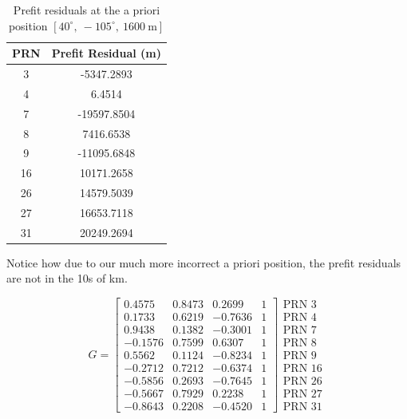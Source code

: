 \documentclass[11pt]{article}
\begin{document}
\begin{table}[h!]
    \centering
    \begin{tabular}{|c|c|}
        \hline
        \textbf{PRN} & \textbf{Prefit Residual (m)} \\ \hline
        3  & -5347.2893 \\ \hline
        4  & 6.4514 \\ \hline
        7  & -19597.8504 \\ \hline
        8  & 7416.6538 \\ \hline
        9  & -11095.6848 \\ \hline
        16 & 10171.2658 \\ \hline
        26 & 14579.5039 \\ \hline
        27 & 16653.7118 \\ \hline
        31 & 20249.2694 \\ \hline
    \end{tabular}
    \caption{Prefit residuals at the a priori position $[40^\circ,\ -105^\circ,\ 1600~\mathrm{m}]$}
    \label{tab:prefit_p3}
\end{table}

\hspace*{2em}Notice how due to our much more incorrect a priori position, the prefit residuals are not in the 10s of km. 

\[
G = \begin{bmatrix}
 0.4575 & 0.8473 &  0.2699 & 1 \\
 0.1733 & 0.6219 & -0.7636 & 1 \\
 0.9438 & 0.1382 & -0.3001 & 1 \\
-0.1576 & 0.7599 &  0.6307 & 1 \\
 0.5562 & 0.1124 & -0.8234 & 1 \\
-0.2712 & 0.7212 & -0.6374 & 1 \\
-0.5856 & 0.2693 & -0.7645 & 1 \\
-0.5667 & 0.7929 &  0.2238 & 1 \\
-0.8643 & 0.2208 & -0.4520 & 1
\end{bmatrix}
\begin{array}{l}
\text{PRN 3} \\ \text{PRN 4} \\ \text{PRN 7} \\ \text{PRN 8} \\ \text{PRN 9} \\ \text{PRN 16} \\ \text{PRN 26} \\ \text{PRN 27} \\ \text{PRN 31}
\end{array}
\]
\end{document}
